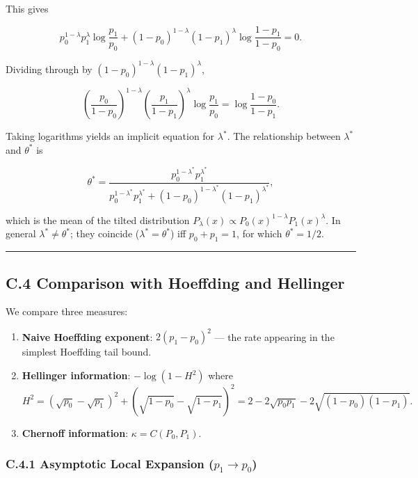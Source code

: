 \documentclass[
  12pt,
]{ctexart}
\providecommand{\tightlist}{%
  \setlength{\itemsep}{0pt}\setlength{\parskip}{0pt}}
\begin{document}
This gives

\[
p_0^{1-\lambda}p_1^\lambda \log\frac{p_1}{p_0}
+ (1-p_0)^{1-\lambda}(1-p_1)^\lambda \log\frac{1-p_1}{1-p_0} = 0. \tag{C.5}
\]

Dividing through by \((1-p_0)^{1-\lambda}(1-p_1)^\lambda\),

\[
\left(\frac{p_0}{1-p_0}\right)^{1-\lambda}
\left(\frac{p_1}{1-p_1}\right)^{\lambda}
\log\frac{p_1}{p_0}
= \log\frac{1-p_0}{1-p_1}.
\]

Taking logarithms yields an implicit equation for \(\lambda^*\). The
relationship between \(\lambda^*\) and \(\theta^*\) is

\[
\theta^* = \frac{p_0^{1-\lambda^*} p_1^{\lambda^*}}
                 {p_0^{1-\lambda^*} p_1^{\lambda^*} + (1-p_0)^{1-\lambda^*}(1-p_1)^{\lambda^*}},
\]

which is the mean of the tilted distribution
\(P_\lambda(x) \propto P_0(x)^{1-\lambda} P_1(x)^\lambda\). In general
\(\lambda^* \neq \theta^*\); they coincide (\(\lambda^* = \theta^*\))
iff \(p_0 + p_1 = 1\), for which \(\theta^* = 1/2\).

\begin{center}\rule{0.5\linewidth}{0.5pt}\end{center}

\subsection{C.4 Comparison with Hoeffding and
Hellinger}\label{c.4-comparison-with-hoeffding-and-hellinger}

We compare three measures:

\begin{enumerate}
\def\labelenumi{\arabic{enumi}.}
\tightlist
\item
  \textbf{Naive Hoeffding exponent}: \(2(p_1-p_0)^2\) --- the rate
  appearing in the simplest Hoeffding tail bound.
\item
  \textbf{Hellinger information}: \(-\log(1-H^2)\) where \[
  H^2 = (\sqrt{p_0} - \sqrt{p_1})^2 + (\sqrt{1-p_0} - \sqrt{1-p_1})^2 = 2 - 2\sqrt{p_0 p_1} - 2\sqrt{(1-p_0)(1-p_1)}.
  \]
\item
  \textbf{Chernoff information}: \(\kappa = C(P_0,P_1)\).
\end{enumerate}

\subsubsection{\texorpdfstring{C.4.1 Asymptotic Local Expansion
(\(p_1 \to p_0\))}{C.4.1 Asymptotic Local Expansion (p\_1 \textbackslash to p\_0)}}\label{c.4.1-asymptotic-local-expansion-p_1-to-p_0}
\end{document}
